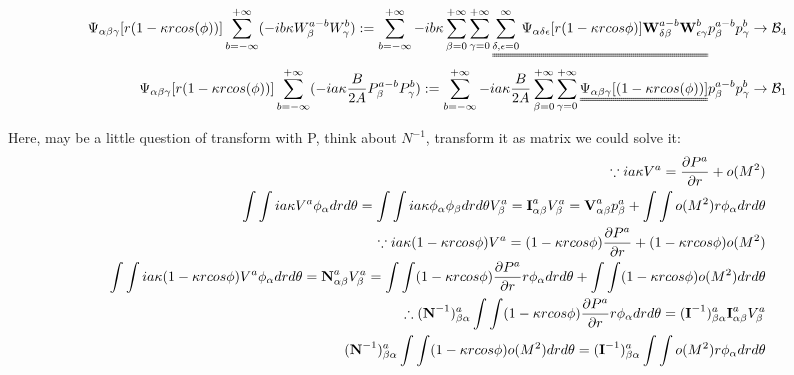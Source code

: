 \documentclass{Note}
\begin{document}
\begin{equation}
\begin{aligned}
\Psi_{\alpha\beta\gamma}[r(1-\kappa r cos(\phi))] \sum_{b=-\infty}^{+\infty}(-ib\kappa W_\beta^{a-b} W_\gamma^{b}):=\sum_{b=-\infty}^{+\infty}-ib\kappa \sum_{\beta=0}^{+\infty}\sum_{\gamma=0}^{+\infty}\uuline{\sum_{\delta,\epsilon=0}^\infty \Psi_{\alpha\delta\epsilon}[r(1-\kappa r cos\phi)]\textbf{W}_{\delta\beta}^{a-b}\textbf{W}_{\epsilon\gamma}^{b}}p_\beta^{a-b}p_\gamma^{b}\rightarrow\mathcal{B}_4\\
\Psi_{\alpha\beta\gamma}[r(1-\kappa r cos(\phi))] \sum_{b=-\infty}^{+\infty}(-ia\kappa  {B\over {2A}}P_\beta^{a-b}P_\gamma^{b}):=\sum_{b=-\infty}^{+\infty}-ia\kappa{B\over 2A} \sum_{\beta=0}^{+\infty}\sum_{\gamma=0}^{+\infty} \uuline{ \Psi_{\alpha\beta\gamma}[ (1-\kappa r cos(\phi))]} p_\beta^{a-b}p_\gamma^{b}\rightarrow\mathcal{B}_1\\
\end{aligned}
\end{equation}

Here, may be a little question of transform with P, think about $N^{-1}$, transform it as matrix we could solve it:
\begin{equation}
\begin{aligned}
\because ia\kappa V^a={\partial P^a\over \partial r}+o(M^2)\\
 \int\int ia\kappa V^a \phi_\alpha dr d\theta=\int\int ia\kappa  \phi_\alpha  \phi_\beta dr d\theta V_\beta^a=\textbf{I}_{\alpha\beta}^a V_\beta^a= \textbf{V}_{\alpha\beta}^ap_\beta^a+\int\int o(M^2)r\phi_\alpha drd\theta\\
\because ia\kappa (1-\kappa r cos\phi)V^a=(1-\kappa r cos\phi){\partial P^a\over \partial r}+(1-\kappa r cos\phi)o(M^2)\\
\int\int ia\kappa (1-\kappa r cos\phi) V^a \phi_\alpha dr d\theta=\textbf{N}_{\alpha\beta}^a V_\beta^a=\int\int(1-\kappa r cos\phi){\partial P^a\over \partial r}r\phi_\alpha dr d\theta+\int\int(1-\kappa r cos\phi)o(M^2) dr d\theta\\
\therefore  (\textbf{N}^{-1})_{\beta\alpha}^a \int\int(1-\kappa r cos\phi){\partial P^a\over \partial r}r\phi_\alpha dr d\theta= (\textbf{I}^{-1})_{\beta\alpha}^a \textbf{I}_{\alpha\beta}^a V_\beta^a\\
 (\textbf{N}^{-1})_{\beta\alpha}^a \int\int(1-\kappa r cos\phi)o(M^2) dr d\theta= (\textbf{I}^{-1})_{\beta\alpha}^a \int\int o(M^2)r\phi_\alpha drd\theta\\
\end{aligned}
\end{equation}
\end{document}

